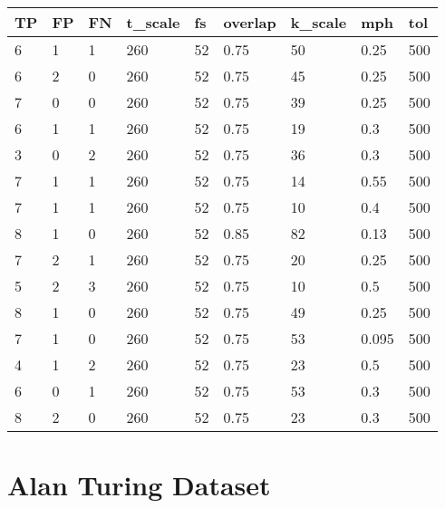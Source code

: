 \begin{table}[!ht]
    \centering
    \begin{tabular}{|l|l|l|l|l|l|l|l|l|}
    \hline
        TP & FP & FN & t\_scale & fs & overlap & k\_scale & mph & tol \\ \hline
        6 & 1 & 1 & 260 & 52 & 0.75 & 50 & 0.25 & 500 \\ \hline
        6 & 2 & 0 & 260 & 52 & 0.75 & 45 & 0.25 & 500 \\ \hline
        7 & 0 & 0 & 260 & 52 & 0.75 & 39 & 0.25 & 500 \\ \hline
        6 & 1 & 1 & 260 & 52 & 0.75 & 19 & 0.3 & 500 \\ \hline
        3 & 0 & 2 & 260 & 52 & 0.75 & 36 & 0.3 & 500 \\ \hline
        7 & 1 & 1 & 260 & 52 & 0.75 & 14 & 0.55 & 500 \\ \hline
        7 & 1 & 1 & 260 & 52 & 0.75 & 10 & 0.4 & 500 \\ \hline
        8 & 1 & 0 & 260 & 52 & 0.85 & 82 & 0.13 & 500 \\ \hline
        7 & 2 & 1 & 260 & 52 & 0.75 & 20 & 0.25 & 500 \\ \hline
        5 & 2 & 3 & 260 & 52 & 0.75 & 10 & 0.5 & 500 \\ \hline
        8 & 1 & 0 & 260 & 52 & 0.75 & 49 & 0.25 & 500 \\ \hline
        7 & 1 & 0 & 260 & 52 & 0.75 & 53 & 0.095 & 500 \\ \hline
        4 & 1 & 2 & 260 & 52 & 0.75 & 23 & 0.5 & 500 \\ \hline
        6 & 0 & 1 & 260 & 52 & 0.75 & 53 & 0.3 & 500 \\ \hline
        8 & 2 & 0 & 260 & 52 & 0.75 & 23 & 0.3 & 500 \\ \hline
    \end{tabular}
\end{table}

\section{Alan Turing Dataset}

